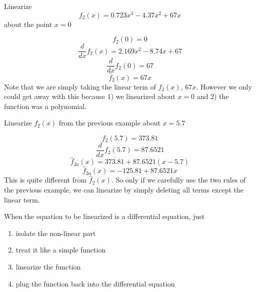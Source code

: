\begin{ExampleSmall}
Linearize
\[
f_2(x) = 0.723x^3 -4.37x^2 +67x
\]
about the point $x=0$
\vspace{0.2in}

\[
f_2(0) = 0
\]
\[
\frac{d}{dx}{f}_2(x) = 2.169x^2 - 8.74x + 67
\]
\[
\frac{d}{dx}{f}_2(0) = 67
\]
\[
\hat{f}_2(x) =  67x
\]
Note that we are simply taking the linear term of $f_2(x)$, $67x$.
However we only could get away with this because 1) we linearized about $x=0$ and 2) the function was a polynomial.
\end{ExampleSmall}

\begin{ExampleSmall}
Linearize $f_2(x)$ from the previous example about $x=5.7$
\vspace{0.2in}

\[
f_2(5.7) = 373.81
\]
\[
\frac{d}{dx}{f}_2(5.7) = 87.6521
\]
\[
\hat{f}_{2a}(x) = 373.81 + 87.6521(x-5.7)
\]
\[
\hat{f}_{2a}(x) = -125.81 + 87.6521x
\]
This is quite different from $\hat{f}_2(x)$.  So only if we carefully use the two rules of the previous example, we
can linearize by simply deleting all terms except the linear term.

\end{ExampleSmall}


When the equation to be linearized is a differential equation,
just

\begin{enumerate}
  \item isolate the non-linear part
  \item treat it like a simple function
  \item linearize the function
  \item plug the function back into the differential equation
\end{enumerate}

